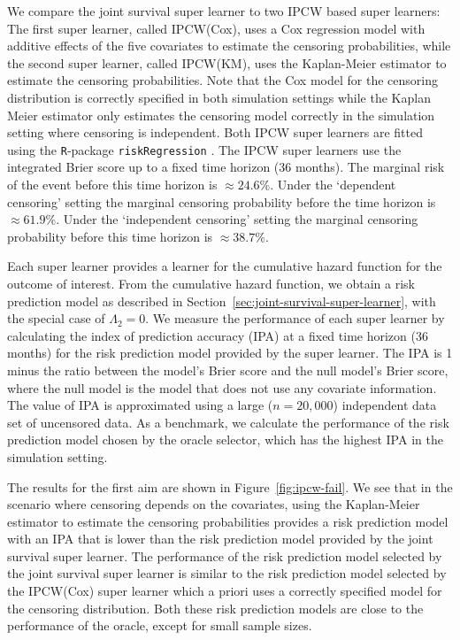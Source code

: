 \documentclass[lineno]{biometrika}
\newcommand{\1}{\mathds{1}}
\begin{document}
We compare the joint survival super learner to two IPCW based super
learners: The first super learner, called IPCW(Cox), uses a Cox
regression model with additive effects of the five covariates to
estimate the censoring probabilities, while the second super learner,
called IPCW(KM), uses the Kaplan-Meier estimator to estimate the
censoring probabilities. Note that the Cox model for the censoring
distribution is correctly specified in both simulation settings while
the Kaplan Meier estimator only estimates the censoring model
correctly in the simulation setting where censoring is
independent. Both IPCW super learners are fitted using the
\texttt{R}-package \texttt{riskRegression}
\citep{Gerds_Ohlendorff_Ozenne_2023}.
%
%
The IPCW super learners use the integrated Brier score up to a fixed time
horizon (36 months). The marginal risk of the event before this time horizon is
\(\approx 24.6\)\%. Under the `dependent censoring' setting the marginal
censoring probability before the time horizon is \(\approx 61.9\)\%. Under the
`independent censoring' setting the marginal censoring probability before this
time horizon is \( \approx 38.7 \)\%.

Each super learner provides a learner for the cumulative hazard
function for the outcome of interest. From the cumulative hazard
function, we obtain a risk prediction model as described in
Section~\ref{sec:joint-survival-super-learner}, with the special case
of $\Lambda_2 = 0$. We measure the performance of each super learner
by calculating the index of prediction accuracy (IPA)
\citep{kattan2018index} at a fixed time horizon (36 months) for the
risk prediction model provided by the super learner. The IPA is 1
minus the ratio between the model's Brier score and the null model's
Brier score, where the null model is the model that does not use any
covariate information. The value of IPA is approximated using a large
(\( n = 20,000 \)) independent data set of uncensored data. As a
benchmark, we calculate the performance of the risk prediction model
chosen by the oracle selector, which has the highest IPA in the
simulation setting.

The results for the first aim are shown in
Figure~\ref{fig:ipcw-fail}. We see that in the scenario where
censoring depends on the covariates, using the Kaplan-Meier estimator
to estimate the censoring probabilities provides a risk prediction
model with an IPA that is lower than the risk prediction model
provided by the joint survival super learner. The performance of the
risk prediction model selected by the joint survival super learner is
similar to the risk prediction model selected by the IPCW(Cox) super
learner which a priori uses a correctly specified model for the
censoring distribution. Both these risk prediction models are close to
the performance of the oracle, except for small sample sizes.
\end{document}

